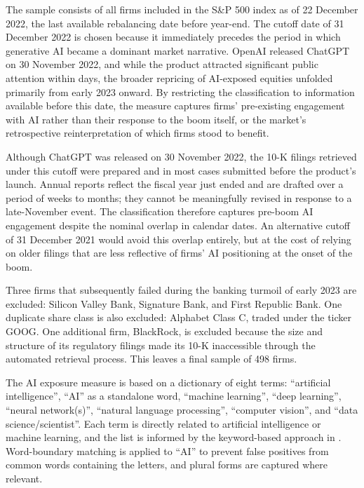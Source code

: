The sample consists of all firms included in the S\&P 500 index as of 22 December 2022, the last available rebalancing date before year-end. The cutoff date of 31 December 2022 is chosen because it immediately precedes the period in which generative AI became a dominant market narrative. OpenAI released ChatGPT on 30 November 2022, and while the product attracted significant public attention within days, the broader repricing of AI-exposed equities unfolded primarily from early 2023 onward. By restricting the classification to information available before this date, the measure captures firms' pre-existing engagement with AI rather than their response to the boom itself, or the market's retrospective reinterpretation of which firms stood to benefit.

Although ChatGPT was released on 30 November 2022, the 10-K filings retrieved under this cutoff were prepared and in most cases submitted before the product's launch. Annual reports reflect the fiscal year just ended and are drafted over a period of weeks to months; they cannot be meaningfully revised in response to a late-November event. The classification therefore captures pre-boom AI engagement despite the nominal overlap in calendar dates. An alternative cutoff of 31 December 2021 would avoid this overlap entirely, but at the cost of relying on older filings that are less reflective of firms' AI positioning at the onset of the boom.

Three firms that subsequently failed during the banking turmoil of early 2023 are excluded: Silicon Valley Bank, Signature Bank, and First Republic Bank. One duplicate share class is also excluded: Alphabet Class C, traded under the ticker GOOG. One additional firm, BlackRock, is excluded because the size and structure of its regulatory filings made its 10-K inaccessible through the automated retrieval process. This leaves a final sample of 498 firms.

The AI exposure measure is based on a dictionary of eight terms: ``artificial intelligence'', ``AI'' as a standalone word, ``machine learning'', ``deep learning'', ``neural network(s)'', ``natural language processing'', ``computer vision'', and ``data science/scientist''. Each term is directly related to artificial intelligence or machine learning, and the list is informed by the keyword-based approach in \citet{anteSaggu2025}. Word-boundary matching is applied to ``AI'' to prevent false positives from common words containing the letters, and plural forms are captured where relevant.


